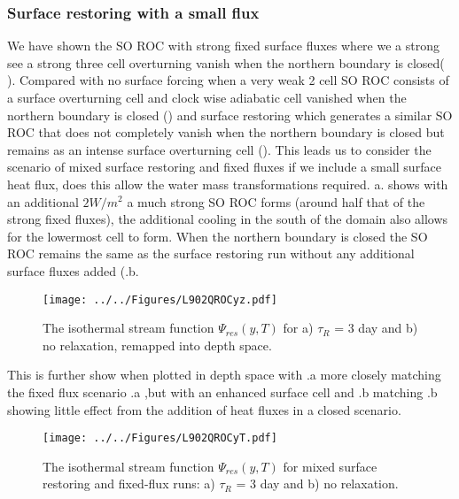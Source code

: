 \subsubsection*{Surface restoring with a small flux}


We have shown the SO ROC with strong fixed surface fluxes where we a strong see a strong three cell overturning vanish when the northern boundary is closed( ). Compared with no surface forcing when a very weak 2 cell SO ROC consists of a surface overturning cell and clock wise adiabatic cell vanished when the northern boundary is closed () and surface restoring which generates a similar SO ROC that does not completely vanish when the northern boundary is closed but remains as an intense surface overturning cell (). This leads us to consider the scenario of mixed surface restoring and fixed fluxes if we include a small surface heat flux, does this allow the water mass transformations required. a. shows with an additional $2W/m^2$ a much strong SO ROC forms (around half that of the strong fixed fluxes), the additional cooling in the south of the domain also allows for the lowermost cell to form. When the northern boundary is closed the SO ROC remains the same as the surface restoring run without any additional surface fluxes added (.b. 
\begin{figure}[H]
\center
\noindent \texttt{[image: ../../Figures/L902QROCyz.pdf]}
\caption{The isothermal stream function $\Psi_{res}(y,T)$ for a) $\tau _R$ = 3 day and b) no relaxation, remapped into depth space.}
\label{fig:L902Qrocyz}
\end{figure}
This is further show when plotted in depth space with .a more closely matching the fixed flux scenario .a ,but with an enhanced surface cell and  .b matching .b showing little effect from the addition of heat fluxes in a closed scenario.
\begin{figure}[H]
\center
\noindent \texttt{[image: ../../Figures/L902QROCyT.pdf]}
\caption{The isothermal stream function $\Psi_{res}(y,T)$ for mixed surface restoring and fixed-flux runs: a) $\tau _R$ = 3 day and b) no relaxation.}
\label{fig:L902QrocyT}
\end{figure}


